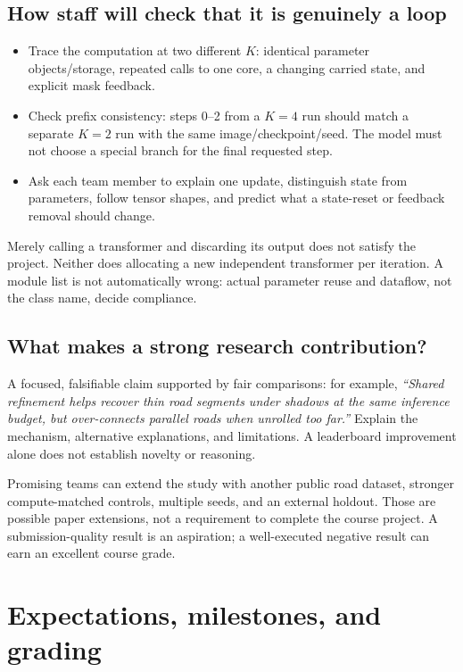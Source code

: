 \documentclass[11pt,letterpaper]{article}
\newcommand{\page}[1]{\clearpage\section{#1}}
\begin{document}
\subsection{How staff will check that it is genuinely a loop}
\begin{itemize}
\item Trace the computation at two different $K$: identical parameter objects/storage, repeated calls to one core, a changing carried state, and explicit mask feedback.
\item Check prefix consistency: steps 0--2 from a $K=4$ run should match a separate $K=2$ run with the same image/checkpoint/seed. The model must not choose a special branch for the final requested step.
\item Ask each team member to explain one update, distinguish state from parameters, follow tensor shapes, and predict what a state-reset or feedback removal should change.
\end{itemize}
Merely calling a transformer and discarding its output does not satisfy the project. Neither does allocating a new independent transformer per iteration. A module list is not automatically wrong: actual parameter reuse and dataflow, not the class name, decide compliance.

\subsection{What makes a strong research contribution?}
A focused, falsifiable claim supported by fair comparisons: for example, \emph{``Shared refinement helps recover thin road segments under shadows at the same inference budget, but over-connects parallel roads when unrolled too far.''} Explain the mechanism, alternative explanations, and limitations. A leaderboard improvement alone does not establish novelty or reasoning.

Promising teams can extend the study with another public road dataset, stronger compute-matched controls, multiple seeds, and an external holdout. Those are possible paper extensions, not a requirement to complete the course project. A submission-quality result is an aspiration; a well-executed negative result can earn an excellent course grade.

\page{Expectations, milestones, and grading}
\end{document}
